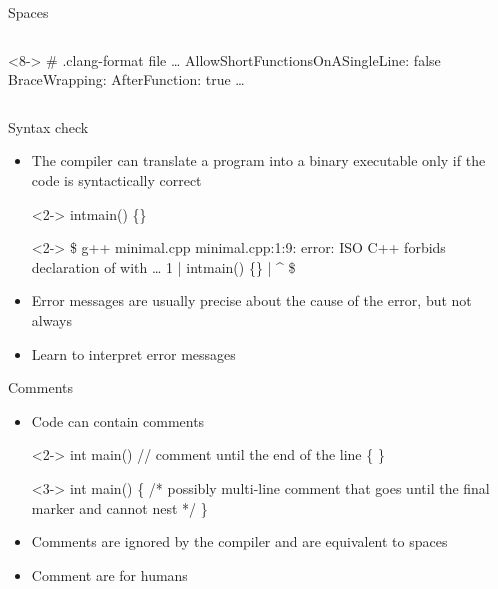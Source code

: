 \begin{frame}[fragile]{Spaces}
\begin{columns}[T]
  \begin{column}{.6\textwidth}
  \begin{codeblock}<8->{
# .clang-format file
\ldots
AllowShortFunctionsOnASingleLine: false
BraceWrapping:
  AfterFunction:   true
  \ldots}\end{codeblock}
  \end{column}
\end{columns}

\end{frame}

\begin{frame}[fragile]{Syntax check}

  \begin{itemize}
  \item The compiler can translate a program into a binary executable only if the
    code is syntactically correct

  \begin{codeblock}<2->{
intmain() \{\}}\end{codeblock}

  \begin{shellblock}<2->{
\$ g++ minimal.cpp
minimal.cpp:1:9: error: ISO C++ forbids declaration of  with \ldots
    1 | intmain() \{\}
      |         ^
\$}\end{shellblock}

  \item<3-> Error messages are usually precise about the cause of the error, but
    not always
  \item<3-> Learn to interpret error messages
  \end{itemize}

\end{frame}

\begin{frame}[fragile]{Comments}

  \begin{itemize}

  \item Code can contain comments

    \begin{codeblock}<2->{
int main() \alert{//} comment until the end of the line
\{
\}}\end{codeblock}

    \begin{codeblock}<3->{
int main()
\{
  \alert{/*} possibly multi-line comment
     that goes until the final marker
     and cannot nest \alert{*/}
\}}\end{codeblock}

  \item<4-> Comments are ignored by the compiler and are equivalent to spaces
  \item<4-> Comment are for humans
  \end{itemize}

\end{frame}

